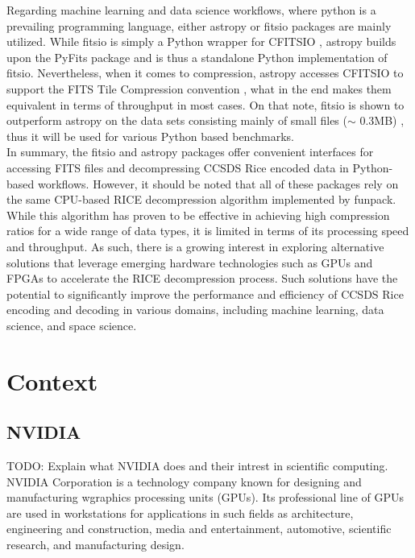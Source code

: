 \documentclass[licencjacka,en]{pracamgr}
\begin{document}
Regarding machine learning and data science workflows, where python is a prevailing programming language, either astropy or fitsio packages are mainly utilized. While fitsio is simply a Python wrapper for CFITSIO \cite{fitsio}, astropy builds upon the PyFits package and is thus a standalone Python implementation of fitsio. Nevertheless, when it comes to compression, astropy accesses CFITSIO to support the FITS Tile Compression convention \cite{astropy}, what in the end makes them equivalent in terms of throughput in most cases. On that note, fitsio is shown to outperform astropy on the data sets consisting mainly of small files ($\sim $ 0.3MB) \cite{astropy vs fitsio}, thus it will be used for various Python based benchmarks. \\

In summary, the fitsio and astropy packages offer convenient interfaces for accessing FITS files and decompressing CCSDS Rice encoded data in Python-based workflows. However, it should be noted that all of these packages rely on the same CPU-based RICE decompression algorithm implemented by funpack. While this algorithm has proven to be effective in achieving high compression ratios for a wide range of data types, it is limited in terms of its processing speed and throughput. As such, there is a growing interest in exploring alternative solutions that leverage emerging hardware technologies such as GPUs and FPGAs to accelerate the RICE decompression process. Such solutions have the potential to significantly improve the performance and efficiency of CCSDS Rice encoding and decoding in various domains, including machine learning, data science, and space science.

\chapter{Context}\label{r:losers}

\section{NVIDIA}
TODO: Explain what NVIDIA does and their intrest in scientific computing. \\

NVIDIA Corporation is a technology company known for designing and manufacturing wgraphics processing units (GPUs). Its professional line of GPUs are used in workstations for applications in such fields as architecture, engineering and construction, media and entertainment, automotive, scientific research, and manufacturing design. \\
\end{document}
